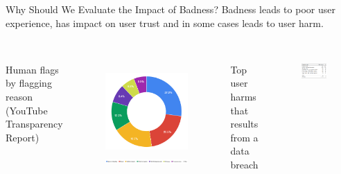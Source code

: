 \documentclass[nobackground,dvipsnames,table]{beamer}
\begin{document}
\begin{frame}{Why Should We Evaluate the Impact of Badness?}
    \centering
    Badness leads to poor user experience, has impact on user trust and in some cases leads to user harm.\\~\\
    \begin{columns}[T]
            \centering
            \small{Human flags by flagging reason (YouTube Transparency Report)}
            \begin{figure}
                \includegraphics[width=\textwidth]{youtube-reports}
                \includegraphics[width=1.5\textwidth]{youtube-reports-key}
            \end{figure}
            \centering
            \small{Top user harms that results from a data breach}
            \begin{figure}
                \includegraphics[width=\textwidth]{potential-harms}
            \end{figure}
    \end{columns}
\end{frame}
\end{document}
